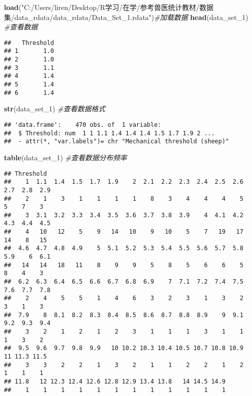 \documentclass[
]{book}
\newenvironment{Shaded}{\begin{snugshade}}{\end{snugshade}}
\newcommand{\CommentTok}[1]{\textcolor[rgb]{0.56,0.35,0.01}{\textit{#1}}}
\newcommand{\FunctionTok}[1]{\textcolor[rgb]{0.13,0.29,0.53}{\textbf{#1}}}
\newcommand{\NormalTok}[1]{#1}
\newcommand{\StringTok}[1]{\textcolor[rgb]{0.31,0.60,0.02}{#1}}
\theoremstyle{definition}
\theoremstyle{definition}
\theoremstyle{definition}
\theoremstyle{definition}
\theoremstyle{remark}
\begin{document}
\begin{Shaded}
\begin{Highlighting}[]
\FunctionTok{load}\NormalTok{(}\StringTok{"C:/Users/liren/Desktop/R学习/在学/参考兽医统计教材/数据集/data\_rdata/data\_rdata/Data\_Set\_1.rdata"}\NormalTok{)}\CommentTok{\#加载数据}
\FunctionTok{head}\NormalTok{(data\_set\_1) }\CommentTok{\#查看数据}
\end{Highlighting}
\end{Shaded}

\begin{verbatim}
##   Threshold
## 1       1.0
## 2       1.0
## 3       1.1
## 4       1.4
## 5       1.4
## 6       1.4
\end{verbatim}

\begin{Shaded}
\begin{Highlighting}[]
\FunctionTok{str}\NormalTok{(data\_set\_1) }\CommentTok{\#查看数据格式}
\end{Highlighting}
\end{Shaded}

\begin{verbatim}
## 'data.frame':    470 obs. of  1 variable:
##  $ Threshold: num  1 1 1.1 1.4 1.4 1.4 1.5 1.7 1.9 2 ...
##  - attr(*, "var.labels")= chr "Mechanical threshold (sheep)"
\end{verbatim}

\begin{Shaded}
\begin{Highlighting}[]
\FunctionTok{table}\NormalTok{(data\_set\_1) }\CommentTok{\#查看数据分布频率}
\end{Highlighting}
\end{Shaded}

\begin{verbatim}
## Threshold
##    1  1.1  1.4  1.5  1.7  1.9    2  2.1  2.2  2.3  2.4  2.5  2.6  2.7  2.8  2.9 
##    2    1    3    1    1    1    1    8    3    4    4    4    5    5    7    3 
##    3  3.1  3.2  3.3  3.4  3.5  3.6  3.7  3.8  3.9    4  4.1  4.2  4.3  4.4  4.5 
##    4   10   12    5    9   14   10    9   10    5    7   19   17   14    8   15 
##  4.6  4.7  4.8  4.9    5  5.1  5.2  5.3  5.4  5.5  5.6  5.7  5.8  5.9    6  6.1 
##   14   14   18   11    8    9    9    5    8    5    6    6    5    8    4    3 
##  6.2  6.3  6.4  6.5  6.6  6.7  6.8  6.9    7  7.1  7.2  7.4  7.5  7.6  7.7  7.8 
##    2    4    5    5    1    4    6    3    2    3    1    3    2    3    1    3 
##  7.9    8  8.1  8.2  8.3  8.4  8.5  8.6  8.7  8.8  8.9    9  9.1  9.2  9.3  9.4 
##    3    2    1    2    1    2    3    1    1    1    3    1    1    1    3    2 
##  9.5  9.6  9.7  9.8  9.9   10 10.2 10.3 10.4 10.5 10.7 10.8 10.9   11 11.3 11.5 
##    3    3    2    2    1    3    2    1    1    2    2    1    2    1    1    1 
## 11.8   12 12.3 12.4 12.6 12.8 12.9 13.4 13.8   14 14.5 14.9 
##    1    1    1    1    1    1    1    1    1    1    1    1
\end{verbatim}
\end{document}
